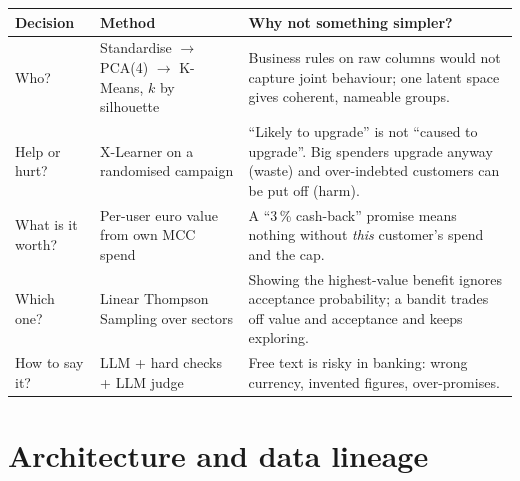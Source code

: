 \documentclass[11pt,a4paper]{article}
\begin{document}
\begin{center}
\small
\begin{tabularx}{\linewidth}{@{}p{2.6cm}p{3.8cm}X@{}}
\toprule
\textbf{Decision} & \textbf{Method} & \textbf{Why not something simpler?}\\
\midrule
Who? & Standardise $\to$ PCA(4) $\to$ K-Means, $k$ by silhouette & Business rules on raw columns would not capture joint behaviour; one latent space gives coherent, nameable groups.\\
Help or hurt? & X-Learner on a randomised campaign & ``Likely to upgrade'' is not ``caused to upgrade''. Big spenders upgrade anyway (waste) and over-indebted customers can be put off (harm).\\
What is it worth? & Per-user euro value from own MCC spend & A ``3\,\% cash-back'' promise means nothing without \emph{this} customer's spend and the cap.\\
Which one? & Linear Thompson Sampling over sectors & Showing the highest-value benefit ignores acceptance probability; a bandit trades off value and acceptance and keeps exploring.\\
How to say it? & LLM + hard checks + LLM judge & Free text is risky in banking: wrong currency, invented figures, over-promises.\\
\bottomrule
\end{tabularx}
\end{center}

\section{Architecture and data lineage}
\end{document}
